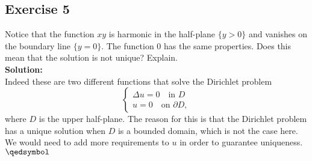 \documentclass[12pt]{article}%
\begin{document}
\subsection*{Exercise 5}
Notice that the function $xy$ is harmonic in the half-plane
$\{y>0\}$ and vanishes on the boundary line $\{y=0\}$. The function 0 has the same properties. Does this mean that the solution is not unique? Explain.\\
\textbf{Solution:}\\
Indeed these are two different functions that solve the Dirichlet
problem
\[
    \begin{cases}
    \Delta u =0 \quad \text{in } D\\
    u =0 \quad \text{on } \partial D,
    \end{cases}
\]
where $D$ is the upper half-plane. The reason for this is that the
Dirichlet problem has a unique solution when $D$ is a bounded domain,
which is not the case here. We would need to add more requirements to $u$
in order to guarantee uniqueness. $\qedsymbol$
\end{document}
